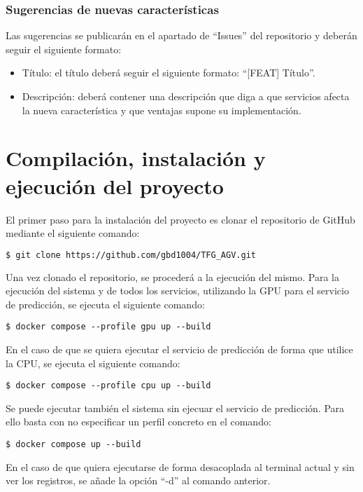 \subsubsection{Sugerencias de nuevas características}
Las sugerencias se publicarán en el apartado de ``Issues'' del repositorio y deberán seguir el siguiente formato:
\begin{itemize}
    \item Título: el título deberá seguir el siguiente formato: ``[FEAT] Título''.
    \item Descripción: deberá contener una descripción que diga a que servicios afecta la nueva característica y 
        que ventajas supone su implementación.
\end{itemize}

\section{Compilación, instalación y ejecución del proyecto}

El primer paso para la instalación del proyecto es clonar el repositorio de GitHub mediante el siguiente comando:
\begin{lstlisting}[language=bash]
$ git clone https://github.com/gbd1004/TFG_AGV.git
\end{lstlisting}

Una vez clonado el repositorio, se procederá a la ejecución del mismo. Para la ejecución del sistema y de 
todos los servicios, utilizando la GPU para el servicio de predicción, se ejecuta el siguiente comando:
\begin{lstlisting}
$ docker compose --profile gpu up --build
\end{lstlisting}
En el caso de que se quiera ejecutar el servicio de predicción de forma que utilice la CPU, se ejecuta el 
siguiente comando:
\begin{lstlisting}
$ docker compose --profile cpu up --build
\end{lstlisting}

Se puede ejecutar también el sistema sin ejecuar el servicio de predicción. Para ello basta con no especificar 
un perfil concreto en el comando:
\begin{lstlisting}
$ docker compose up --build
\end{lstlisting}

En el caso de que quiera ejecutarse de forma desacoplada al terminal actual y sin ver los registros, se añade 
la opción ``-d'' al comando anterior.

